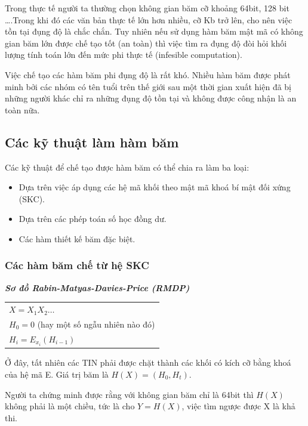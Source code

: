 \documentclass[a4paper,12pt]{report}
\begin{document}
Trong thực tế người ta thường chọn không gian băm cỡ khoảng 64bit, 128 bit \ldots .Trong khi đó các văn bản thực tế lớn hơn nhiều, cỡ Kb trở lên, cho nên việc tồn tại đụng độ là chắc chắn. Tuy nhiên nếu sử dụng hàm băm mật mã có không gian băm lớn được chế tạo tốt (an toàn) thì việc tìm ra đụng độ đòi hỏi khối lượng tính toán lớn đến mức phi thực tế (infesible computation).

Việc chế tạo các hàm băm phi đụng độ là rất khó. Nhiều hàm băm được phát minh bởi các nhóm có tên tuổi trên thế giới sau một thời gian xuất hiện đã bị những người khác chỉ ra những đụng độ tồn tại và không được công nhận là an toàn nữa.
\subsection*{Các kỹ thuật làm hàm băm}
Các kỹ thuật để chế tạo được hàm băm có thể chia ra làm ba loại:
\begin{itemize}
\item Dựa trên việc áp dụng các hệ mã khối theo mật mã khoá bí mật đối xứng (SKC).
\item Dựa trên các phép toán số học đồng dư.
\item Các hàm thiết kế băm đặc biệt.
\end{itemize}
\subsubsection{Các hàm băm chế từ hệ SKC}
\textbf{\textit{Sơ đồ Rabin-Matyas-Davies-Price (RMDP)}}
\begin{center}
\begin{tabular}{l}
$X = X_1 X_2 \ldots$ \\
$H_0 = 0$ (hay một số ngẫu nhiên nào đó) \\
$H_i = E_{x_i}(H_{i - 1})$ \\
\end{tabular}
\end{center}

Ở đây, tất nhiên các TIN phải được chặt thành các khối có kích cỡ bằng khoá của hệ mã E. Giá trị băm là $H(X) = (H_0,H_t)$.

Người ta chứng minh được rằng với không gian băm chỉ là 64bit thì $H(X)$ không phải là một chiều, tức là cho $Y=H(X)$, việc tìm ngược được X là khả thi.
\end{document}
